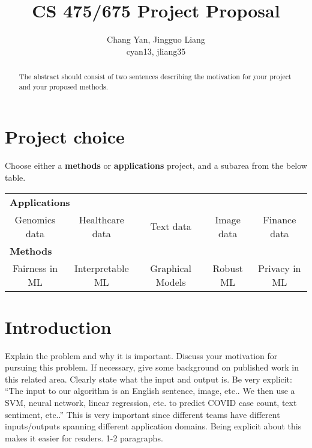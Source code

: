 \documentclass{article}
\title{CS 475/675 Project Proposal}
\author{
  Chang Yan, Jingguo Liang\\
  cyan13, jliang35
}
\newcommand{\Checked}{{\LARGE \XBox}}%
\newcommand{\Unchecked}{{\LARGE \Square}}%
\begin{document}
\maketitle

\begin{abstract}
The abstract should consist of two sentences describing the motivation for your project and your proposed methods.
\end{abstract}

\section{Project choice}

Choose either a {\bf methods} or {\bf applications} project, and a subarea from the below table.
\begin{table}[!h]
\centering
\def\arraystretch{2}
\begin{tabular}{c c c c c }
\toprule
\multicolumn{5}{l}{\Unchecked \bf Applications} \\
\Unchecked Genomics data & 
\Unchecked Healthcare data & 
\Unchecked Text data &
\Unchecked Image data &
\Unchecked Finance data \\
\midrule
\multicolumn{5}{l}{\Unchecked \bf Methods} \\
\Unchecked Fairness in ML &
\Unchecked Interpretable ML &
\Unchecked Graphical Models &
\Unchecked Robust ML &
\Unchecked Privacy in ML \\
\bottomrule
\end{tabular}
\end{table}

\section{Introduction}	
Explain the problem and why it is important. Discuss your motivation for pursuing this
problem. If necessary, give some background on published work in this related area. Clearly state what the input and output
is. Be very explicit: “The input to our algorithm is an {English sentence,
image, etc.}. We then use a {SVM, neural network, linear
regression, etc.} to predict {COVID case count, text sentiment, etc.}.”
This is very important since different teams have different inputs/outputs spanning different
application domains. Being explicit about this makes it easier for readers. 1-2 paragraphs.
\end{document}
